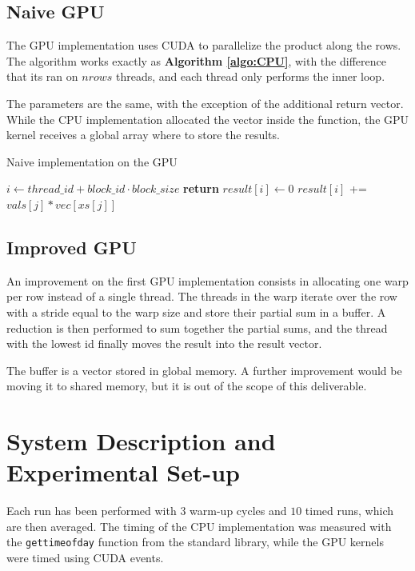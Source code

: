 \documentclass[conference]{IEEEtran}
\begin{document}
\subsection{Naive GPU}
The GPU implementation uses CUDA to parallelize the product along the rows. The algorithm works exactly as \textbf{Algorithm \ref{algo:CPU}}, with the difference that its ran on $nrows$ threads, and each thread only performs the inner loop.

The parameters are the same, with the exception of the additional return vector. While the CPU implementation allocated the vector inside the function, the GPU kernel receives a global array where to store the results.
\begin{algorithm}[ht!]
    \caption{Naive implementation on the GPU}
    \begin{algorithmic}[1]
        \State $i \gets thread\_id + block\_id\cdot block\_size$
        \State \textbf{return}
        \EndIf
        \State $result[i] \gets 0$
        \For{$j$ in $[ys[i]\dots ys[i+1])$} %
        \State $result[i]$ += $vals[j] * vec[xs[j]]$
        \EndFor
        \EndProcedure
    \end{algorithmic}
    \label{algo:GPU}
\end{algorithm}

\subsection{Improved GPU}
An improvement on the first GPU implementation consists in allocating one warp per row instead of a single thread. The threads in the warp iterate over the row with a stride equal to the warp size and store their partial sum in a buffer. A reduction is then performed to sum together the partial sums, and the thread with the lowest id finally moves the result into the result vector.

The buffer is a vector stored in global memory. A further improvement would be moving it to shared memory, but it is out of the scope of this deliverable.

\section{System Description and Experimental Set-up}
Each run has been performed with $3$ warm-up cycles and $10$ timed runs, which are then averaged. The timing of the CPU implementation was measured with the \texttt{gettimeofday} function from the standard library, while the GPU kernels were timed using CUDA events.
\end{document}
